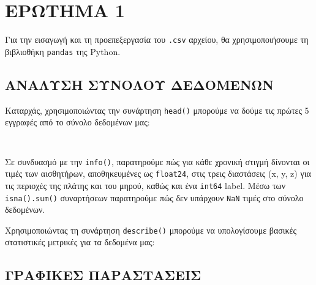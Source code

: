 \chapter{ΕΡΩΤΗΜΑ 1}
    Για την εισαγωγή και τη προεπεξεργασία του \texttt{.csv} αρχείου, θα χρησιμοποιήσουμε τη βιβλιοθήκη \texttt{pandas} της Python.

    \section{ΑΝΑΛΥΣΗ ΣΥΝΟΛΟΥ ΔΕΔΟΜΕΝΩΝ}
        Καταρχάς, χρησιμοποιώντας την συνάρτηση \texttt{head()} μπορούμε να δούμε τις πρώτες 5 εγγραφές από το σύνολο δεδομένων μας:

        \begin{table}[ht] \noindent\centering\tt
        \end{table}

        Σε συνδυασμό με την \texttt{info()}, παρατηρούμε πώς για κάθε χρονική στιγμή δίνονται οι τιμές των αισθητήρων, αποθηκευμένες ως \texttt{float24},
        στις τρεις διαστάσεις (x, y, z) για τις περιοχές της πλάτης και του μηρού, καθώς και ένα \texttt{int64} label. Μέσω των \texttt{isna().sum()} συναρτήσεων παρατηρούμε πώς δεν υπάρχουν \texttt{NaN} τιμές στο σύνολο δεδομένων.

        Χρησιμοποιώντας τη συνάρτηση \texttt{describe()} μπορούμε να υπολογίσουμε βασικές στατιστικές μετρικές για τα δεδομένα μας:



    \section{ΓΡΑΦΙΚΕΣ ΠΑΡΑΣΤΑΣΕΙΣ}